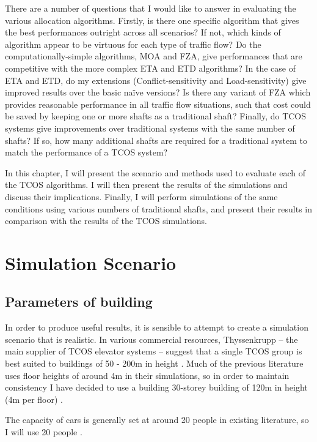 \documentclass{UoYCSproject}
\begin{document}
There are a number of questions that I would like to answer in evaluating the various allocation algorithms.  Firstly, is there one specific algorithm that gives the best performances outright across all scenarios?  If not, which kinds of algorithm appear to be virtuous for each type of traffic flow?  Do the computationally-simple algorithms, MOA and FZA, give performances that are competitive with the more complex ETA and ETD algorithms?  In the case of ETA and ETD, do my extensions (Conflict-sensitivity and Load-sensitivity) give improved results over the basic na\"{i}ve versions?  Is there any variant of FZA which provides reasonable performance in all traffic flow situations, such that cost could be saved by keeping one or more shafts as a traditional shaft?  Finally, do TCOS systems give improvements over traditional systems with the same number of shafts?  If so, how many additional shafts are required for a traditional system to match the performance of a TCOS system?

In this chapter, I will present the scenario and methods used to evaluate each of the TCOS algorithms.  I will then present the results of the simulations and discuss their implications.  Finally, I will perform simulations of the same conditions using various numbers of traditional shafts, and present their results in comparison with the results of the TCOS simulations.

\section{Simulation Scenario}

\subsection{Parameters of building}

In order to produce useful results, it is sensible to attempt to create a simulation scenario that is realistic.  In various commercial resources, Thyssenkrupp -- the main supplier of TCOS elevator systems -- suggest that a single TCOS group is best suited to buildings of 50 - 200m in height \citep{ThyssenkruppFactSheet, ThyssenkruppWebsite}.  Much of the previous literature uses floor heights of around 4m in their simulations, so in order to maintain consistency I have decided to use a building 30-storey building of 120m in height (4m per floor) \citep{Brand2004, Nikovski2003, Rong2003}.

The capacity of cars is generally set at around 20 people in existing literature, so I will use 20 people \citep{Rong2003, Crites1996, Siikonen1993}.
\end{document}
